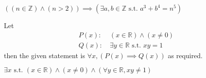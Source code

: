 \begin{questions}
    \item $\left((n \in \mathbb{Z}) \land (n > 2)\right) \implies \left(\exists a, b \in \mathbb{Z} \text{ s.t. } a^3 + b^4 = n^5\right)$

    \item \begin{partquestions}{\roman*}
        \item Let
        \begin{align*}
            P(x):&\ (x \in \mathbb{R}) \land (x \neq 0)\\
            Q(x):&\ \exists y \in \mathbb{R} \text{ s.t. } xy = 1
        \end{align*}
        then the given statement is $\forall x, (P(x) \implies Q(x))$ as required.

        \item $\exists x \text{ s.t. } (x \in \mathbb{R}) \land (x \neq 0) \land (\forall y \in \mathbb{R}, xy \neq 1)$
    \end{partquestions}
\end{questions}
